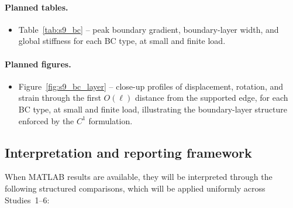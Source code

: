 \documentclass[11pt]{article}
\begin{document}
\paragraph{Planned tables.}
\begin{itemize}
  \item Table~\ref{tab:s9_bc} -- peak boundary gradient,
    boundary-layer width, and global stiffness for each BC
    type, at small and finite load.
\end{itemize}

\paragraph{Planned figures.}
\begin{itemize}
  \item Figure~\ref{fig:s9_bc_layer} -- close-up profiles of
    displacement, rotation, and strain through the first
    $O(\ell)$ distance from the supported edge, for each BC
    type, at small and finite load, illustrating the
    boundary-layer structure enforced by the $C^1$
    formulation.
\end{itemize}

\subsection{Interpretation and reporting framework}
\label{ssec:s9_interp}

When MATLAB results are available, they will be interpreted
through the following structured comparisons, which will be
applied uniformly across Studies~1--6:
\end{document}
